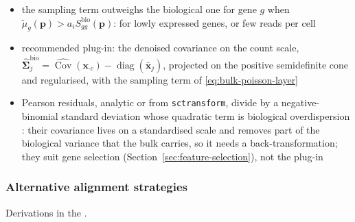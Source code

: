 \begin{itemize}
        per-cell depth of the reference (\(a_{i}=1\)), and otherwise under-weights (\(a_{i}<1\)) or over-weights (\(a_{i}>1\))
        the bulk sampling noise
  \item the sampling term outweighs the biological one for gene \(g\) when
        \(\tilde\mu_{g}(\boldsymbol{p})>a_{i}S^{\mathrm{bio}}_{gg}(\boldsymbol{p})\): for lowly expressed genes, or few reads per cell
  \item recommended plug-in: the denoised covariance on the count scale,
        \(\hat{\boldsymbol{\Sigma}}^{\mathrm{bio}}_{j}=\widehat{\operatorname{Cov}}(\boldsymbol{x}_{\cdot c})-\operatorname{diag}(\bar{\boldsymbol{x}}_{j})\), projected on the
        positive semidefinite cone and regularised, with the sampling term of \eqref{eq:bulk-poisson-layer}
  \item Pearson residuals, analytic or from \texttt{sctransform}, divide by a negative-binomial standard deviation whose
        quadratic term is biological overdispersion \cite{hafemeisterNormalizationVarianceStabilization2019,lauseAnalyticPearsonResiduals2021}:
        their covariance lives on a standardised scale and removes part of the biological variance that the bulk carries,
        so it needs a back-transformation; they suit gene selection (Section~\ref{sec:feature-selection}), not the plug-in
\end{itemize}

\subsubsection{Alternative alignment strategies}
\label{app:alignment}

Derivations in the .


